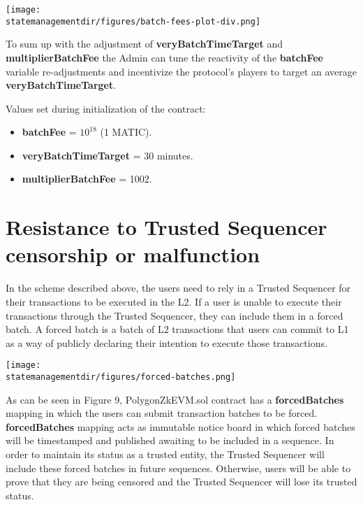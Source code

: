 \begin{center}
	\texttt{[image: \\statemanagementdir/figures/batch-fees-plot-div.png]}
	
\end{center}

To sum up with the adjustment of \textbf{veryBatchTimeTarget} and \textbf{multiplierBatchFee} the Admin can tune the reactivity of the \textbf{batchFee} variable re-adjustments and incentivize the protocol's players to target an average \textbf{veryBatchTimeTarget}.

Values set during initialization of the contract:
\begin{itemize}
	\item \textbf{batchFee} = $10^{18}$ (1 MATIC).
	\item \textbf{veryBatchTimeTarget} = 30 minutes.
	\item \textbf{multiplierBatchFee} = 1002.
\end{itemize}



\section{Resistance to Trusted Sequencer censorship or malfunction}

In the scheme described above, the users need to rely in a Trusted Sequencer for their transactions to be executed in the L2. If a user is unable to execute their transactions through the Trusted Sequencer, they can include them in a forced batch. A forced batch is a batch of L2 transactions that users can commit to L1 as a way of publicly declaring their intention to execute those transactions.

\begin{center}
	\texttt{[image: \\statemanagementdir/figures/forced-batches.png]}
	
\end{center}

As can be seen in Figure 9, PolygonZkEVM.sol contract has a \textbf{forcedBatches} mapping in which the users can submit transaction batches to be forced. \textbf{forcedBatches} mapping acts as immutable notice board in which forced batches will be timestamped and published awaiting to be included in a sequence. In order to maintain its status as a trusted entity, the Trusted Sequencer will include these forced batches in future sequences. Otherwise, users will be able to prove that they are being censored and the Trusted Sequencer will lose its trusted status.   

